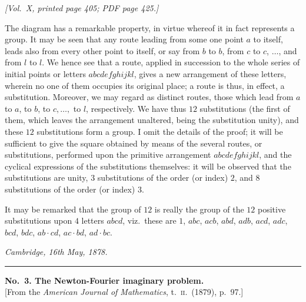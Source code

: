 \documentclass[11pt]{article}
\begin{document}
\newpage

\noindent\textit{[Vol.~X, printed page 405; PDF page 425.]}

\medskip

The diagram has a remarkable property, in virtue whereof it in fact represents a group. It may be seen that any route leading from some one point $a$ to itself, leads also from every other point to itself, or say from $b$ to $b$, from $c$ to $c$, $\ldots$, and from $l$ to $l$. We hence see that a route, applied in succession to the whole series of initial points or letters $abcdefghijkl$, gives a new arrangement of these letters, wherein no one of them occupies its original place; a route is thus, in effect, a substitution. Moreover, we may regard as distinct routes, those which lead from $a$ to $a$, to $b$, to $c, \ldots,$ to $l$, respectively. We have thus $12$ substitutions (the first of them, which leaves the arrangement unaltered, being the substitution unity), and these $12$ substitutions form a group. I omit the details of the proof; it will be sufficient to give the square obtained by means of the several routes, or substitutions, performed upon the primitive arrangement $abcdefghijkl$, and the cyclical expressions of the substitutions themselves: it will be observed that the substitutions are unity, $3$ substitutions of the order (or index) $2$, and $8$ substitutions of the order (or index) $3$.

\medskip

It may be remarked that the group of $12$ is really the group of the $12$ positive substitutions upon $4$ letters $abcd$, viz.\ these are $1$, $abc$, $acb$, $abd$, $adb$, $acd$, $adc$, $bcd$, $bdc$, $ab\cdot cd$, $ac\cdot bd$, $ad\cdot bc$.

\medskip

\hfill\textit{Cambridge, 16th May, 1878.}

\bigskip
\bigskip

\begin{center}
\rule{0.25\textwidth}{0.3pt}
\end{center}

\bigskip

\begin{center}
\textbf{No.~3. The Newton-Fourier imaginary problem.}\\[4pt]
\small [From the \textit{American Journal of Mathematics}, t.~\textsc{ii}.\ (1879), p.~97.]
\end{center}

\medskip
\end{document}
